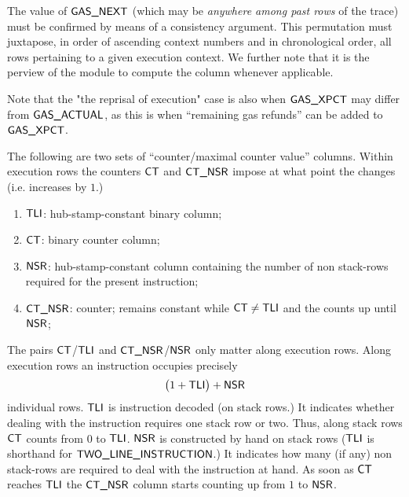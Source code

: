 \saNote{}
The value of $\textsf{GAS}\textsf{\_NEXT}$ (which may be \emph{anywhere among past rows} of the trace) must be confirmed by means of a consistency argument.
This permutation must juxtapose, in order of ascending context numbers and in chronological order, all rows pertaining to a given execution context.
We further note that it is the perview of the \stpMod{} module to compute the \gasStipend{} column whenever applicable.

Note that the "the reprisal of execution" case is also when $\textsf{GAS}\textsf{\_XPCT}$ may differ from $\textsf{GAS}\textsf{\_ACTUAL}$, as this is when ``remaining gas refunds'' can be added to $\textsf{GAS}\textsf{\_XPCT}$.

The following are two sets of ``counter/maximal counter value'' columns. Within execution rows the counters $\textsf{CT}$ and $\textsf{CT}\textsf{\_}\textsf{NSR}$ impose at what point the \hubStamp{} changes (i.e. increases by $1$.)
\begin{enumerate}[resume]
	\item $\textsf{TLI}{}$:
		hub-stamp-constant binary column;
	\item $\textsf{CT}$:
		binary counter column;
	\item $\textsf{NSR}$:
		hub-stamp-constant column containing the number of non stack-rows required for the present instruction;
	\item $\textsf{CT}\textsf{\_}\textsf{NSR}$:
		counter; remains constant while $\textsf{CT}\neq\textsf{TLI}$ and the counts up until $\textsf{NSR}$;
\end{enumerate}
The pairs
$\textsf{CT}$/$\textsf{TLI}$ and
$\textsf{CT}\textsf{\_}\textsf{NSR}$/$\textsf{NSR}$
only matter along execution rows.
Along execution rows an instruction occupies precisely
\[
	\big( 1 + \textsf{TLI} \big) + \textsf{NSR}
\]
individual rows.
$\textsf{TLI}$ is instruction decoded (on stack rows.)
It indicates whether dealing with the instruction requires one stack row or two.
Thus, along stack rows $\textsf{CT}$ counts from $0$ to $\textsf{TLI}$.
$\textsf{NSR}$ is constructed by hand on stack rows ($\textsf{TLI}$ is shorthand for $\textsf{TWO\_LINE\_INSTRUCTION}{}$.)
It indicates how many (if any) non stack-rows are required to deal with the instruction at hand.
As soon as $\textsf{CT}$ reaches $\textsf{TLI}$ the $\textsf{CT}\textsf{\_}\textsf{NSR}$ column starts counting up from $1$ to $\textsf{NSR}$.
